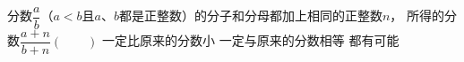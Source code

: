 分数$\dfrac{a}{b}$（$a<b$且$a$、$b$都是正整数）的分子和分母都加上相同的正整数$n$，
所得的分数$\dfrac{a+n}{b+n}$\hfill$\left(\qquad\right)$
 {一定比原来的分数小} {一定与原来的分数相等} {都有可能}